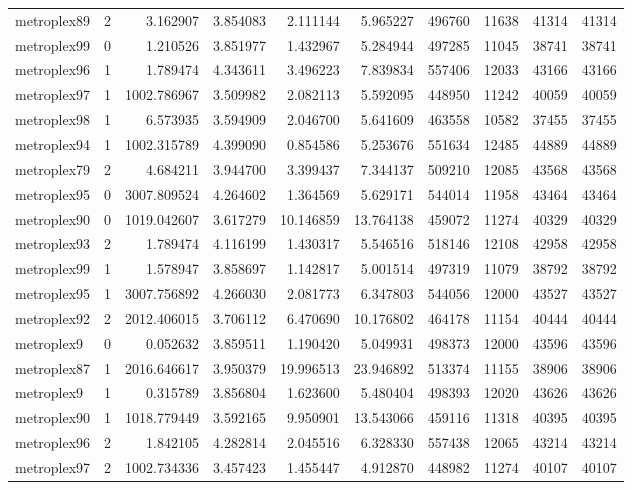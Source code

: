 \begin{longtable}{|l|r|r|r|r|r|r|r|r|r|}
metroplex89 & 2 & 3.162907 & 3.854083 & 2.111144 & 5.965227 & 496760 & 11638 & 41314 & 41314 \\
metroplex99 & 0 & 1.210526 & 3.851977 & 1.432967 & 5.284944 & 497285 & 11045 & 38741 & 38741 \\
metroplex96 & 1 & 1.789474 & 4.343611 & 3.496223 & 7.839834 & 557406 & 12033 & 43166 & 43166 \\
metroplex97 & 1 & 1002.786967 & 3.509982 & 2.082113 & 5.592095 & 448950 & 11242 & 40059 & 40059 \\
metroplex98 & 1 & 6.573935 & 3.594909 & 2.046700 & 5.641609 & 463558 & 10582 & 37455 & 37455 \\
metroplex94 & 1 & 1002.315789 & 4.399090 & 0.854586 & 5.253676 & 551634 & 12485 & 44889 & 44889 \\
metroplex79 & 2 & 4.684211 & 3.944700 & 3.399437 & 7.344137 & 509210 & 12085 & 43568 & 43568 \\
metroplex95 & 0 & 3007.809524 & 4.264602 & 1.364569 & 5.629171 & 544014 & 11958 & 43464 & 43464 \\
metroplex90 & 0 & 1019.042607 & 3.617279 & 10.146859 & 13.764138 & 459072 & 11274 & 40329 & 40329 \\
metroplex93 & 2 & 1.789474 & 4.116199 & 1.430317 & 5.546516 & 518146 & 12108 & 42958 & 42958 \\
metroplex99 & 1 & 1.578947 & 3.858697 & 1.142817 & 5.001514 & 497319 & 11079 & 38792 & 38792 \\
metroplex95 & 1 & 3007.756892 & 4.266030 & 2.081773 & 6.347803 & 544056 & 12000 & 43527 & 43527 \\
metroplex92 & 2 & 2012.406015 & 3.706112 & 6.470690 & 10.176802 & 464178 & 11154 & 40444 & 40444 \\
metroplex9 & 0 & 0.052632 & 3.859511 & 1.190420 & 5.049931 & 498373 & 12000 & 43596 & 43596 \\
metroplex87 & 1 & 2016.646617 & 3.950379 & 19.996513 & 23.946892 & 513374 & 11155 & 38906 & 38906 \\
metroplex9 & 1 & 0.315789 & 3.856804 & 1.623600 & 5.480404 & 498393 & 12020 & 43626 & 43626 \\
metroplex90 & 1 & 1018.779449 & 3.592165 & 9.950901 & 13.543066 & 459116 & 11318 & 40395 & 40395 \\
metroplex96 & 2 & 1.842105 & 4.282814 & 2.045516 & 6.328330 & 557438 & 12065 & 43214 & 43214 \\
metroplex97 & 2 & 1002.734336 & 3.457423 & 1.455447 & 4.912870 & 448982 & 11274 & 40107 & 40107 \\

\end{longtable}
